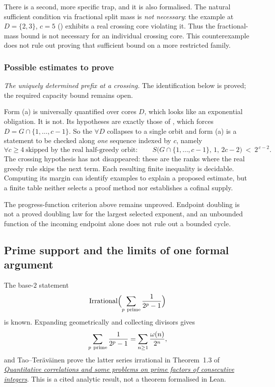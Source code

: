 There is a second, more specific trap, and it is also formalised. The natural sufficient
condition via fractional split mass is \emph{not necessary}: the example at $D=\{2,3\}$, $c=5$
()
exhibits a real crossing core violating it. Thus the fractional-mass bound is not necessary for an individual
crossing core.  This counterexample does not rule out proving that
sufficient bound on a more restricted family.

\subsubsection*{Possible estimates to prove}

\emph{The uniquely determined prefix at a crossing.} The identification
below is proved; the required capacity bound remains open.

Form (a) is universally quantified over cores $D$, which looks like an exponential obligation.
It is not. Its hypotheses are exactly those of
,
which forces $D=G\cap\{1,\ldots,c-1\}$. So the $\forall D$ collapses
to a single orbit and form (a) is a statement to be checked along \emph{one} sequence indexed by
$c$, namely
\[
\forall c\ge4\ \text{skipped by the real half-greedy orbit}:\qquad
\ensuremath{S}\bigl(G\cap\{1,\ldots,c-1\},\,1,\,2c-2\bigr)\ <\ 2^{\,c-2}.
\]
The crossing hypothesis has not disappeared: these are the ranks
where the real greedy rule skips the next term.  Each resulting
finite inequality is decidable.  Computing its margin can identify
examples to explain a proposed estimate, but a finite table neither
selects a proof method nor establishes a cofinal supply.

The progress-function criterion above remains unproved.  Endpoint
doubling is not a proved doubling law for the largest selected
exponent, and an unbounded function of the incoming endpoint alone
does not rule out a bounded cycle.

\subsection{Prime support and the limits of one formal argument}
\label{sec:invent-R3}

The base-$2$ statement
\[
\mathrm{Irrational}\Bigl(\sum_{p\ {\rm prime}}\frac1{2^p-1}\Bigr)
\]
is known.  Expanding geometrically and collecting divisors gives
\[
 \sum_{p\ {\rm prime}}\frac1{2^p-1}
 =\sum_{n\ge1}\frac{\omega(n)}{2^n},
\]
and Tao--Ter\"av\"ainen prove the latter series irrational in Theorem~1.3
of
\href{https://arxiv.org/abs/2512.01739}{\emph{Quantitative correlations and
some problems on prime factors of consecutive integers}}.  This is a cited
analytic result, not a theorem formalised in Lean.

